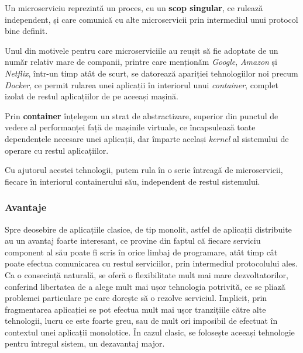 \begin{definition}
	\label{def:microservice}
	Un microserviciu reprezintă un proces, cu un \textbf{scop singular}, ce rulează independent, și care comunică cu alte microservicii prin intermediul unui protocol bine definit.
\end{definition}

Unul din motivele pentru care microserviciile au reușit să fie adoptate de un număr relativ mare de companii, printre care menționăm \textit{Google}, \textit{Amazon} și \textit{Netflix}, într-un timp atât de scurt, se datorează apariției tehnologiilor noi precum \textit{Docker}, ce permit rularea unei aplicații în interiorul unui \textit{container}, complet izolat de restul aplicațiilor de pe aceeași mașină. 

\begin{definition}
	Prin \textbf{container} înțelegem un strat de abstractizare, superior din punctul de vedere al performanței față de mașinile virtuale, ce  încapsulează toate dependențele necesare unei aplicații, dar împarte același \textit{kernel} al sistemului de operare cu restul aplicațiilor.
\end{definition}

Cu ajutorul acestei tehnologii, putem rula în o serie întreagă de microservicii, fiecare în interiorul containerului său, independent de restul sistemului.

\subsubsection{Avantaje}

Spre deosebire de aplicațiile clasice, de tip monolit, astfel de aplicații distribuite au un avantaj foarte interesant, ce provine din faptul că fiecare serviciu component al său poate fi scris în orice limbaj de programare, atât timp cât poate efectua comunicarea cu restul serviciilor, prin intermediul protocolului ales. Ca o consecință naturală, se oferă o flexibilitate mult mai mare dezvoltatorilor, conferind libertatea de a alege mult mai ușor tehnologia potrivită, ce se pliază problemei particulare pe care dorește să o rezolve serviciul. Implicit, prin fragmentarea aplicației se pot efectua mult mai ușor tranzițiile către alte tehnologii, lucru ce este foarte greu, sau de mult ori imposibil de efectuat în contextul unei aplicații monolotice. În cazul clasic, se folosește aceeași tehnologie pentru întregul sistem, un dezavantaj major.

